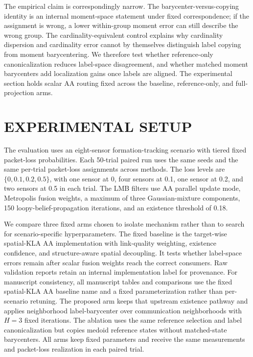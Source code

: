 \documentclass{IEEEtaes}
\newcommand{\method}{neighborhood label-barycenter}
\begin{document}
The empirical claim is correspondingly narrow. The barycenter-versus-copying identity is an internal moment-space statement under fixed correspondence; if the assignment is wrong, a lower within-group moment error can still describe the wrong group. The cardinality-equivalent control explains why cardinality dispersion and cardinality error cannot by themselves distinguish label copying from moment barycentering. We therefore test whether reference-only canonicalization reduces label-space disagreement, and whether matched moment barycenters add localization gains once labels are aligned. The experimental section holds scalar AA routing fixed across the baseline, reference-only, and full-projection arms.

\section{EXPERIMENTAL SETUP}
The evaluation uses an eight-sensor formation-tracking scenario with tiered fixed packet-loss probabilities. Each 50-trial paired run uses the same seeds and the same per-trial packet-loss assignments across methods. The loss levels are $\{0,0.1,0.2,0.5\}$, with one sensor at 0, four sensors at 0.1, one sensor at 0.2, and two sensors at 0.5 in each trial. The LMB filters use AA parallel update mode, Metropolis fusion weights, a maximum of three Gaussian-mixture components, 150 loopy-belief-propagation iterations, and an existence threshold of 0.18.

We compare three fixed arms chosen to isolate mechanism rather than to search for scenario-specific hyperparameters. The fixed baseline is the target-wise spatial-KLA AA implementation with link-quality weighting, existence confidence, and structure-aware spatial decoupling. It tests whether label-space errors remain after scalar fusion weights reach the correct consumers. Raw validation reports retain an internal implementation label for provenance. For manuscript consistency, all manuscript tables and comparisons use the fixed spatial-KLA AA baseline name and a fixed parameterization rather than per-scenario retuning. The proposed arm keeps that upstream existence pathway and applies \method{} over communication neighborhoods with $H=3$ fixed iterations. The ablation uses the same reference selection and label canonicalization but copies medoid reference states without matched-state barycenters. All arms keep fixed parameters and receive the same measurements and packet-loss realization in each paired trial.
\end{document}
